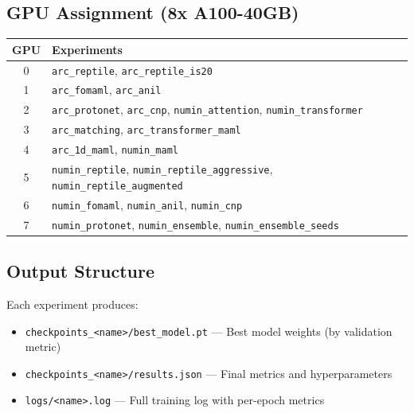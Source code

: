\documentclass[11pt,a4paper]{article}
\begin{document}
\subsection{GPU Assignment (8x A100-40GB)}
\begin{center}
\begin{tabular}{cl}
\toprule
\textbf{GPU} & \textbf{Experiments} \\
\midrule
0 & \texttt{arc\_reptile}, \texttt{arc\_reptile\_is20} \\
1 & \texttt{arc\_fomaml}, \texttt{arc\_anil} \\
2 & \texttt{arc\_protonet}, \texttt{arc\_cnp}, \texttt{numin\_attention}, \texttt{numin\_transformer} \\
3 & \texttt{arc\_matching}, \texttt{arc\_transformer\_maml} \\
4 & \texttt{arc\_1d\_maml}, \texttt{numin\_maml} \\
5 & \texttt{numin\_reptile}, \texttt{numin\_reptile\_aggressive}, \texttt{numin\_reptile\_augmented} \\
6 & \texttt{numin\_fomaml}, \texttt{numin\_anil}, \texttt{numin\_cnp} \\
7 & \texttt{numin\_protonet}, \texttt{numin\_ensemble}, \texttt{numin\_ensemble\_seeds} \\
\bottomrule
\end{tabular}
\end{center}

\subsection{Output Structure}
Each experiment produces:
\begin{itemize}[nosep]
  \item \texttt{checkpoints\_<name>/best\_model.pt} --- Best model weights (by validation metric)
  \item \texttt{checkpoints\_<name>/results.json} --- Final metrics and hyperparameters
  \item \texttt{logs/<name>.log} --- Full training log with per-epoch metrics
\end{itemize}
\end{document}
